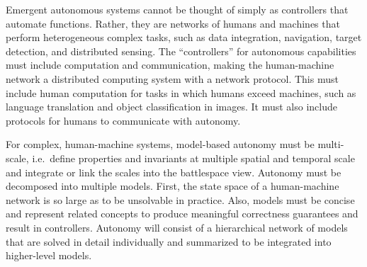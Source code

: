 Emergent autonomous systems cannot be thought of simply as controllers that automate functions.  Rather, they are networks of humans and machines that
perform heterogeneous complex tasks, such as data integration, navigation, target detection, and distributed sensing.  The ``controllers'' for 
autonomous capabilities must include computation and communication, making the human-machine network a distributed computing system with a 
network protocol.  This must include human computation for tasks in which humans exceed machines, such as language translation and 
object classification in images.  It must also include protocols for humans to communicate with autonomy. 

For complex, human-machine systems, model-based autonomy must be multi-scale, i.e.~define properties and invariants at multiple spatial and temporal scale
and integrate or link the scales into the battlespace view.  Autonomy must be decomposed into multiple models.  First, 
the state space of a human-machine network is so large as to be unsolvable in practice.  
Also, models must be concise and represent related concepts to produce meaningful correctness guarantees and result in controllers.
Autonomy will consist of a hierarchical network of models that are solved in detail individually and summarized to be integrated
into higher-level models.





